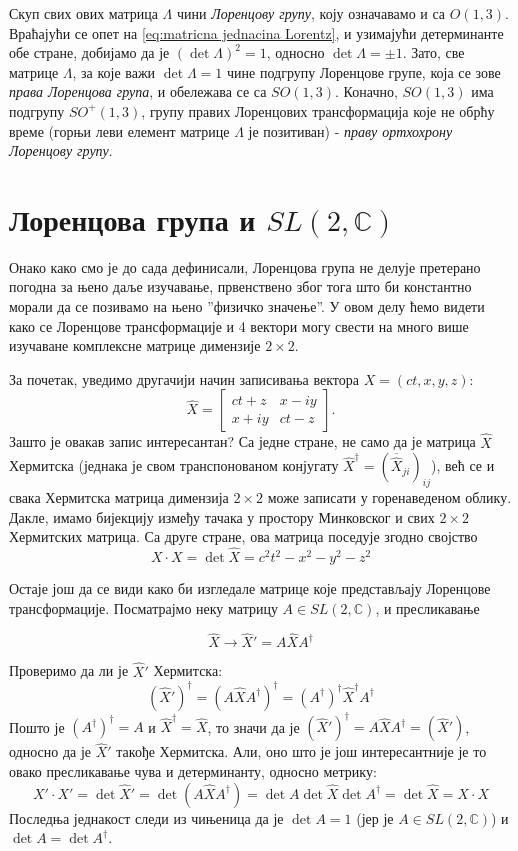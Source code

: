 \documentclass{report}
\theoremstyle{plain}
\theoremstyle{definition}
\begin{document}
Скуп свих ових матрица $\Lambda$ чини \emph{Лоренцову групу}, коју означавамо и са $O(1, 3)$. Враћајући се опет на \eqref{eq:matricna jednacina Lorentz}, и узимајући детерминанте обе стране, добијамо да је $(\det\Lambda)^2 = 1$, односно $\det\Lambda = \pm 1$. Зато, све матрице $\Lambda$, за које важи $\det\Lambda = 1$ чине подгрупу Лоренцове групе, која се зове \emph{права Лоренцова група}, и обележава се са $SO(1, 3)$. Коначно, $SO(1, 3)$ има подгрупу $SO^+(1, 3)$, групу правих Лоренцових трансформација које не обрћу време (горњи леви елемент матрице $\Lambda$ је позитиван) - \emph{праву ортхохрону Лоренцову групу}.

\section{Лоренцова група и $SL(2, \mathbb{C})$}
Онако како смо је до сада дефинисали, Лоренцова група не делује претерано погодна за њено даље изучавање, првенствено због тога што би константно морали да се позивамо на њено ''физичко значење''. У овом делу ћемо видети како се Лоренцове трансформације и 4 вектори могу свести на много више изучаване комплексне матрице димензије $2\times 2$.

За почетак, уведимо другачији начин записивања вектора $X = (ct, x, y, z)$:
$$\hat X = \begin{bmatrix}
            ct+z & x-iy \\
            x+iy & ct-z
           \end{bmatrix}.$$
Зашто је овакав запис интересантан? Са једне стране, не само да је матрица $\hat X$ Хермитска (једнака је свом транспонованом конјугату ${\hat X}^\dag = (\overline{\hat X}_{ji})_{ij}$), већ се и свака Хермитска матрица димензија $2\times 2$ може записати у горенаведеном облику. Дакле, имамо бијекцију између тачака у простору Минковског и свих $2\times 2$ Хермитских матрица. Са друге стране, ова матрица поседује згодно својство
$$X \cdot X = \det \hat X = c^2 t^2 - x^2 - y^2 - z^2$$

Остаје још да се види како би изгледале матрице које представљају Лоренцове трансформације. Посматрајмо неку матрицу $A\in SL(2, \mathbb{C})$, и пресликавање

\begin{equation}
\label{eq:spinor map1}
\hat X \to \hat X' = A\hat X A^\dag \tag{\maltese}
\end{equation}

Проверимо да ли је $\hat X'$ Хермитска:
$$(\hat X')^\dag = (A\hat X A^\dag)^\dag = (A^\dag)^\dag {\hat X}^\dag A^\dag$$
Пошто је $(A^\dag)^\dag = A$ и ${\hat X}^\dag = \hat X$, то значи да је $(\hat X')^\dag = A\hat X A^\dag = (\hat X')$, односно да је $\hat X'$ такође Хермитска. Али, оно што је још интересантније је то овако пресликавање чува и детерминанту, односно метрику:
$$X'\cdot X' = \det \hat X' = \det(A\hat X A^\dag) = \det A \det \hat X \det A^\dag = \det \hat X = X\cdot X$$
Последња једнакост следи из чињеница да је $\det A = 1$ (јер је $A\in SL(2, \mathbb{C})$) и $\det A = \det A^\dag$.
\end{document}
